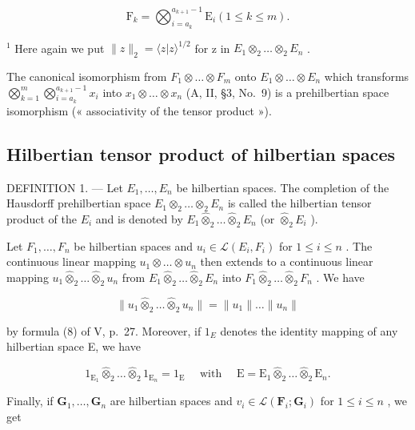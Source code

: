 \[
\mathrm{F} _ {k} = \bigotimes_ {i = a _ {k}} ^ {a _ {k + 1} - 1} \mathrm{E} _ {i} (1 \leqslant k \leqslant m).
\]

\(^{1}\) Here again we put \(\|z\|_{2} = \langle z|z\rangle^{1/2}\) for z in \(E_{1} \otimes_{2} \ldots \otimes_{2} E_{n}\) .

The canonical isomorphism from \(F_{1} \otimes \ldots \otimes F_{m}\) onto \(E_{1} \otimes \ldots \otimes E_{n}\) which transforms \(\bigotimes_{k=1}^{m} \bigotimes_{i=a_{k}}^{a_{k+1}-1} x_{i}\) into \(x_{1} \otimes \ldots \otimes x_{n}\) (A, II, §3, No.~9) is a prehilbertian space isomorphism (« associativity of the tensor product »).

\subsection{Hilbertian tensor product of hilbertian spaces}

DEFINITION 1. --- Let \(E_{1}, \ldots, E_{n}\) be hilbertian spaces. The completion of the Hausdorff prehilbertian space \(E_{1} \otimes_{2} \ldots \otimes_{2} E_{n}\) is called the hilbertian tensor product of the \(E_{i}\) and is denoted by \(E_{1} \hat{\otimes}_{2} \ldots \hat{\otimes}_{2} E_{n}\) (or \(\hat{\otimes}_{2} E_{i}\) ).

Let \(F_{1}, \ldots, F_{n}\) be hilbertian spaces and \(u_{i} \in \mathcal{L}(E_{i}, F_{i})\) for \(1 \leqslant i \leqslant n\) . The continuous linear mapping \(u_{1} \otimes \ldots \otimes u_{n}\) then extends to a continuous linear mapping \(u_{1} \hat{\otimes}_{2} \ldots \hat{\otimes}_{2} u_{n}\) from \(E_{1} \hat{\otimes}_{2} \ldots \hat{\otimes}_{2} E_{n}\) into \(F_{1} \hat{\otimes}_{2} \ldots \hat{\otimes}_{2} F_{n}\) . We have

\[
\| u _ {1} \hat {\otimes} _ {2} \dots \hat {\otimes} _ {2} u _ {n} \| = \| u _ {1} \| \dots \| u _ {n} \|\tag{10}
\]

by formula (8) of V, p.~27. Moreover, if \(1_{E}\) denotes the identity mapping of any hilbertian space E, we have

\[
1 _ {\mathrm{E} _ {1}} \hat {\otimes} _ {2} \dots \hat {\otimes} _ {2} 1 _ {\mathrm{E} _ {n}} = 1 _ {\mathrm{E}} \quad \text { with } \quad \mathrm{E} = \mathrm{E} _ {1} \hat {\otimes} _ {2} \dots \hat {\otimes} _ {2} \mathrm{E} _ {n}.\tag{11}
\]

Finally, if \(\mathbf{G}_1, \ldots, \mathbf{G}_n\) are hilbertian spaces and \(v_i \in \mathcal{L}(\mathbf{F}_i; \mathbf{G}_i)\) for \(1 \leqslant i \leqslant n\) , we get

